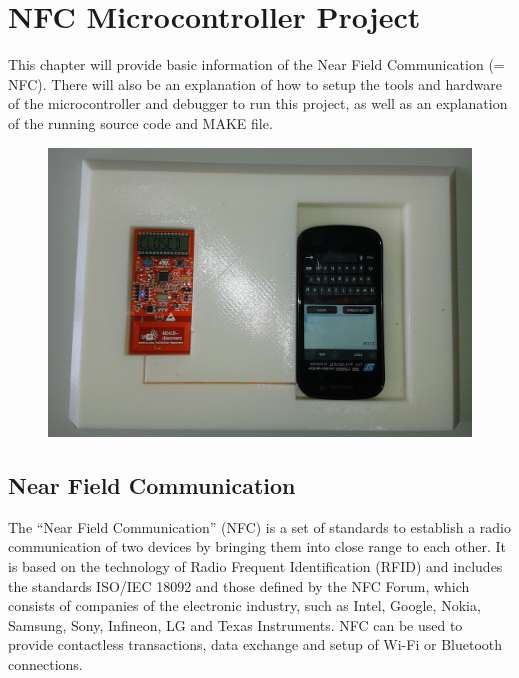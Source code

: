 \documentclass[11pt]{article}
\begin{document}
\newpage


\thispagestyle{fancy} %



\section{NFC Microcontroller Project}

This chapter will provide basic information of the Near Field Communication (= NFC). There will also be an explanation of how to
setup the tools and hardware of the microcontroller and debugger to run this project, as well as an explanation of the running source code and MAKE file.

\begin{figure}[H]

 \centering
 \includegraphics [width=16cm]{NFCProject.jpg}
\end{figure}


\newpage
\subsection{Near Field Communication}

The "`Near Field Communication"' (NFC) is a set of standards to establish a radio communication of two devices by bringing them into close range to each other.
It is based on the technology of Radio Frequent Identification (RFID) and includes the standards ISO/IEC 18092 and those defined by the NFC Forum, which consists of
companies of the electronic industry, such as Intel, Google, Nokia, Samsung, Sony, Infineon, LG and Texas Instruments\cite{cite2}.
NFC can be used to provide contactless transactions, data exchange and setup of Wi-Fi or Bluetooth connections.\cite{cite1}
\end{document}
